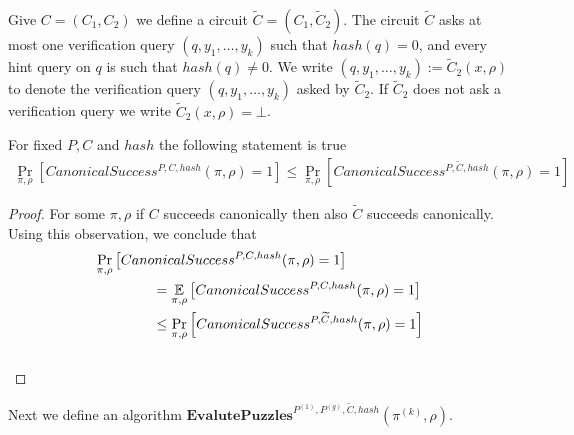 %
Give $C = (C_1, C_2)$ we define a circuit $\widetilde{C} = (C_1, \widetilde{C}_2)$.
The circuit $\widetilde{C}$ asks at most one verification query $(q, y_1, \dots, y_k)$
such that $hash(q) = 0$, and every hint query on $q$ is such that $hash(q) \neq 0$.
We write $(q, y_1, \dots, y_k) := \widetilde{C}_2(x, \rho)$ to denote
the verification query $(q, y_1, \dots, y_k)$ asked by $\widetilde{C}_2$.
If $\widetilde{C}_2$ does not ask a verification query we write $\widetilde{C}_2(x, \rho) = \bot $.
%
\begin{lemma}
  \label{lemma:ctilda_c}
  For fixed $P, C$ and $hash$ the following statement is true
  \begin{align*}
    \underset{\pi, \rho}{\Pr}[CanonicalSuccess^{P, C, hash}(\pi, \rho) = 1]
    \leq \underset{\pi, \rho}{\Pr}[CanonicalSuccess^{P, \widetilde{C}, hash}(\pi, \rho) = 1]
  \end{align*}
\end{lemma}
%
\begin{proof}
For some $\pi, \rho$ if $C$ succeeds canonically then also $\widetilde{C}$ succeeds canonically.
Using this observation, we conclude that
\begin{align*}
  &\underset{\pi, \rho}{\Pr}\left[CanonicalSuccess^{P, C, hash}(\pi, \rho) = 1\right] \\
  &\mbox\qquad\qquad = \underset{\pi, \rho}{\mathbb{E}}\left[CanonicalSuccess^{P, C, hash}(\pi, \rho) = 1 \right] \\
  &\mbox\qquad\qquad \leq \underset{\pi, \rho}{\Pr}\left[CanonicalSuccess^{P, \widetilde{C}, hash}(\pi, \rho) = 1\right]
\end{align*}
\\\text{  }
\end{proof}
%
Next we define an algorithm $\textbf{EvalutePuzzles}^{P^{(1)}, P^{(g)}, \widetilde{C}, hash}(\pi^{(k)}, \rho)$.
%
